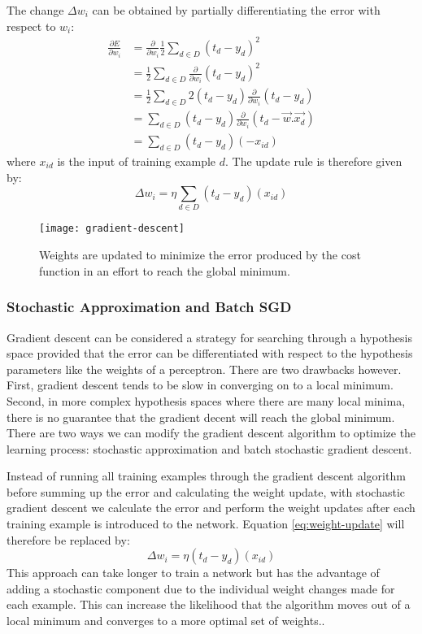 The change $\Delta w_i$ can be obtained by partially differentiating the error with respect to $w_i$:
\begin{equation}
\begin{split}
\frac{\partial E}{\partial w_i} & = \frac{\partial}{\partial w_i} \frac{1}{2} \sum_{d \in D} (t_d - y_d)^2\\
& = \frac{1}{2} \sum_{d \in D} \frac{\partial}{\partial w_i} (t_d - y_d)^2\\
& = \frac{1}{2} \sum_{d \in D} 2(t_d - y_d) \frac{\partial}{\partial w_i} (t_d - y_d) \\
& = \sum_{d \in D} (t_d - y_d) \frac{\partial}{\partial w_i} (t_d - \vec{w}.\vec{x_d}) \\
& = \sum_{d \in D} (t_d - y_d) (-x_{id})
\end{split}
\end{equation}
where $x_{id}$ is the input of training example $d$. The update rule is therefore given by:
\begin{equation} \label{eq:weight-update}
\Delta w_i = \eta \sum_{d \in D} (t_d - y_d) (x_{id})
\end{equation}

\begin{figure}[t]
	\centering
	\texttt{[image: gradient-descent]}
	\caption{Weights are updated to minimize the error produced by the cost function in an effort to reach the global minimum.}
	\label{fig:gradient-descent}
\end{figure}

\subsubsection{Stochastic Approximation and Batch SGD}

Gradient descent can be considered a strategy for searching through a hypothesis space provided that the error can be differentiated with respect to the hypothesis parameters like the weights of a perceptron. There are two drawbacks however. First, gradient descent tends to be slow in converging on to a local minimum. Second, in more complex hypothesis spaces where there are many local minima, there is no guarantee that the gradient decent will reach the global minimum. There are two ways we can modify the gradient descent algorithm to optimize the learning process: stochastic approximation and batch stochastic gradient descent\cite{Mitchell}.

Instead of running all training examples through the gradient descent algorithm before summing up the error and calculating the weight update, with stochastic gradient descent we calculate the error and perform the weight updates after each training example is introduced to the network. Equation \ref{eq:weight-update} will therefore be replaced by:
\begin{equation}
\Delta w_i = \eta (t_d - y_d) (x_{id})
\end{equation}
This approach can take longer to train a network but has the advantage of adding a stochastic component due to the individual weight changes made for each example. This can increase the likelihood that the algorithm moves out of a local minimum and converges to a more optimal set of weights.\cite{Mitchell}.

